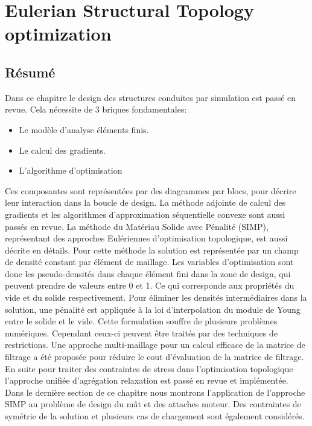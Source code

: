 \chapter{Eulerian Structural Topology optimization}
\label{chap:2}
\minitoc
\begin{mdframed}[hidealllines=true,backgroundcolor=lightgray!20]
\section*{Résumé}
Dans ce chapitre le design des structures conduites par simulation est passé en revue. Cela nécessite de 3 briques fondamentales: 
\begin{itemize}
\item Le modèle d'analyse éléments finis.
\item Le calcul des gradients.
\item L'algorithme d'optimisation
\end{itemize} 
Ces composantes sont représentées par des diagrammes par blocs, pour décrire leur interaction dans la boucle de design. La méthode adjointe de calcul des gradients et les algorithmes d'approximation séquentielle convexe sont aussi passés en revue.
La méthode du Matériau Solide avec Pénalité (SIMP), représentant des approches Eulériennes d'optimisation topologique, est aussi décrite en détails. Pour cette méthode la solution est représentée par un champ de densité constant par élément de maillage. Les variables d'optimisation sont donc les pseudo-densités dans chaque élément fini dans la zone de design, qui peuvent prendre de valeurs entre 0 et 1. Ce qui corresponde aux propriétés du vide et du solide respectivement. Pour éliminer les densités intermédiaires dans la solution, une pénalité est appliquée à la loi d'interpolation du module de Young entre le solide et le vide. Cette formulation souffre de plusieurs problèmes numériques. Cependant ceux-ci peuvent être traités par des techniques de restrictions. Une approche multi-maillage pour un calcul efficace de la matrice de filtrage a été proposée pour réduire le cout d'évaluation de la matrice de filtrage. En suite pour traiter des contraintes de stress dans l'optimisation topologique l'approche unifiée d'agrégation relaxation \cite{verbart2017unified} est passé en revue et implémentée. Dans le dernière section de ce chapitre nous montrons l'application de l'approche SIMP au problème de design du mât et des attaches moteur. Des contraintes de symétrie de la solution et plusieurs cas de chargement sont également considérés.
\end{mdframed}

